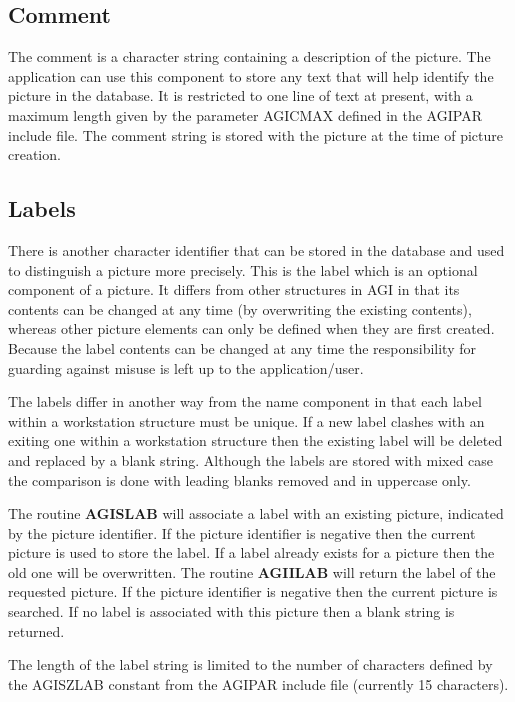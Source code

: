 \documentclass[twoside,11pt]{article}
\newcommand{\htmlref}[2]{#1}
\renewcommand{\_}{\texttt{\symbol{95}}}
\begin{document}
\subsection{Comment}
The comment is a character string containing a description of the
picture. The application can use this component to store any text that
will help identify the picture in the database.
It is restricted to one line of text at present, with a maximum length
given by the parameter AGI\_\_CMAX defined in the AGI\_PAR include file.
The comment string is stored with the picture at the time of picture creation.

\subsection{Labels}\label{lab}
There is another character identifier that can be stored in the database
and used to distinguish a picture more precisely. This is the label which
is an optional component of a picture.
It differs from other structures in AGI in that its contents can be
changed at any time (by overwriting the existing contents), whereas
other picture elements can only be defined when they are first created.
Because the label contents can be changed at any time the responsibility
for guarding against misuse is left up to the application/user.

The labels differ in another way from the name component in that each
label within a workstation structure must be unique. If a new label clashes
with an exiting one within a workstation structure then the existing label
will be deleted and replaced by a blank string. Although the labels are
stored with mixed case the comparison is done with leading blanks removed
and in uppercase only.

The routine \htmlref{{\bf AGI\_SLAB}}{AGI_SLAB}
will associate a label with an existing picture,
indicated by the picture identifier. If the picture identifier is negative
then the current picture is used to store the label. If a label already
exists for a picture then the old one will be overwritten.
The routine \htmlref{{\bf AGI\_ILAB}}{AGI_ILAB}
will return the label of the requested picture.
If the picture identifier is negative then the current picture is searched.
If no label is associated with this picture then a blank string is returned.

The length of the label string is limited to the number of characters defined
by the AGI\_\_SZLAB constant from the AGI\_PAR include file
(currently 15 characters).
\end{document}

